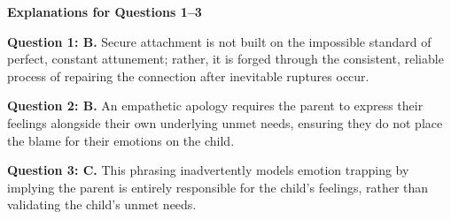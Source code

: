 \begin{practiceexercise}
\textbf{Explanations for Questions 1--3}

\textbf{Question 1: B.} Secure attachment is not built on the impossible standard of perfect, constant attunement; rather, it is forged through the consistent, reliable process of repairing the connection after inevitable ruptures occur.
\vspace{\fill}

\textbf{Question 2: B.} An empathetic apology requires the parent to express their feelings alongside their own underlying unmet needs, ensuring they do not place the blame for their emotions on the child.
\vspace{\fill}

\textbf{Question 3: C.} This phrasing inadvertently models emotion trapping by implying the parent is entirely responsible for the child's feelings, rather than validating the child's unmet needs.
\vspace{\fill}
\newpage


\end{practiceexercise}
